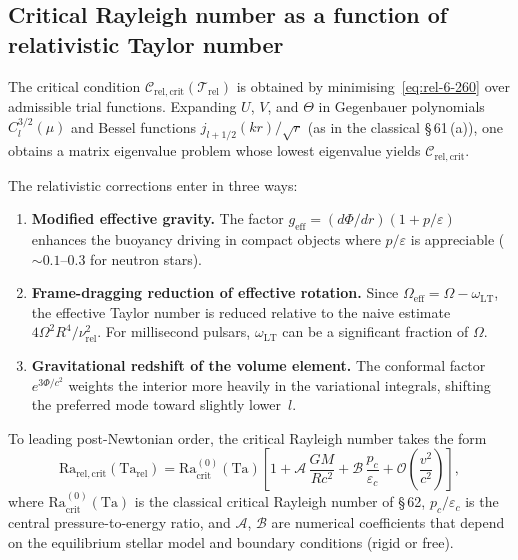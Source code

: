 \subsection{Critical Rayleigh number as a function of
  relativistic Taylor number}\label{sec:rel-62a}

The critical condition
$\mathcal{C}_{\mathrm{rel,crit}}(\mathscr{T}_{\mathrm{rel}})$
is obtained by minimising~\eqref{eq:rel-6-260} over admissible
trial functions.  Expanding $U$, $V$, and $\Theta$ in Gegenbauer
polynomials $C_{l}^{3/2}(\mu)$ and Bessel functions
$j_{l+1/2}(kr)/\sqrt{r}$ (as in the classical \S\,61\,(a)),
one obtains a matrix eigenvalue problem whose lowest eigenvalue
yields $\mathcal{C}_{\mathrm{rel,crit}}$.

The relativistic corrections enter in three ways:
\begin{enumerate}
\item \textbf{Modified effective gravity.}  The factor
  $g_{\mathrm{eff}} = (d\Phi/dr)(1 + p/\varepsilon)$ enhances the
  buoyancy driving in compact objects where $p/\varepsilon$ is
  appreciable ($\sim 0.1$--$0.3$ for neutron stars).
\item \textbf{Frame-dragging reduction of effective rotation.}
  Since $\Omega_{\mathrm{eff}} = \Omega - \omega_{\mathrm{LT}}$,
  the effective Taylor number is reduced relative to the naive
  estimate $4\Omega^{2}R^{4}/\nu_{\mathrm{rel}}^{2}$.  For
  millisecond pulsars, $\omega_{\mathrm{LT}}$ can be a significant
  fraction of $\Omega$.
\item \textbf{Gravitational redshift of the volume element.}
  The conformal factor $e^{3\Phi/c^{2}}$ weights the interior more
  heavily in the variational integrals, shifting the preferred mode
  toward slightly lower~$l$.
\end{enumerate}

To leading post-Newtonian order, the critical Rayleigh number takes
the form
\begin{equation}\label{eq:rel-6-Racrit}
  \mathrm{Ra}_{\mathrm{rel,crit}}(\mathrm{Ta}_{\mathrm{rel}})
  = \mathrm{Ra}_{\mathrm{crit}}^{(0)}(\mathrm{Ta})
    \left[
      1 + \mathcal{A}\,\frac{GM}{Rc^{2}}
        + \mathcal{B}\,\frac{p_{c}}{\varepsilon_{c}}
        + \mathcal{O}\!\left(\frac{v^{2}}{c^{2}}\right)
    \right],
\end{equation}
where $\mathrm{Ra}_{\mathrm{crit}}^{(0)}(\mathrm{Ta})$ is the
classical critical Rayleigh number of \S\,62,
$p_{c}/\varepsilon_{c}$ is the central pressure-to-energy ratio,
and $\mathcal{A}$, $\mathcal{B}$ are numerical coefficients
that depend on the equilibrium stellar model and boundary
conditions (rigid or free).

